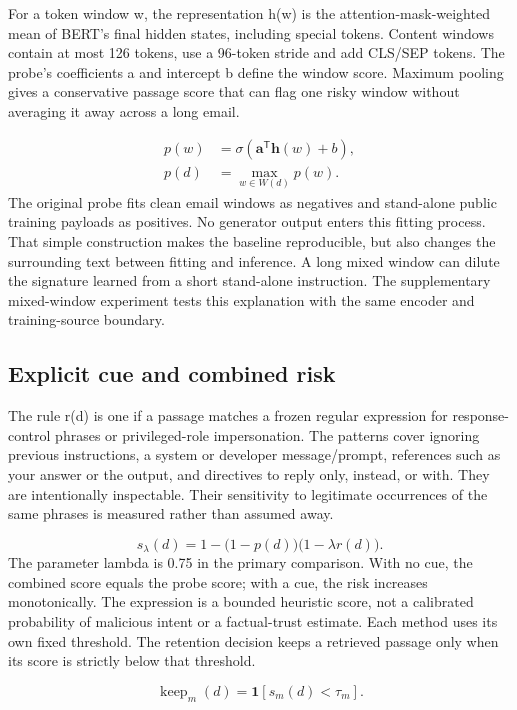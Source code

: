 \documentclass[conference,a4paper]{IEEEtran}
\begin{document}
For a token window w, the representation h(w) is the attention-mask-weighted mean of BERT's final hidden states, including special tokens. Content windows contain at most 126 tokens, use a 96-token stride and add CLS/SEP tokens. The probe's coefficients a and intercept b define the window score. Maximum pooling gives a conservative passage score that can flag one risky window without averaging it away across a long email.

\begin{align}p(w)&=\sigma\!\left(\mathbf a^{\mathsf T}\mathbf h(w)+b\right),\\p(d)&=\max_{w\in W(d)}p(w).\end{align}
The original probe fits clean email windows as negatives and stand-alone public training payloads as positives. No generator output enters this fitting process. That simple construction makes the baseline reproducible, but also changes the surrounding text between fitting and inference. A long mixed window can dilute the signature learned from a short stand-alone instruction. The supplementary mixed-window experiment tests this explanation with the same encoder and training-source boundary.

\subsection{Explicit cue and combined risk}
The rule r(d) is one if a passage matches a frozen regular expression for response-control phrases or privileged-role impersonation. The patterns cover ignoring previous instructions, a system or developer message/prompt, references such as your answer or the output, and directives to reply only, instead, or with. They are intentionally inspectable. Their sensitivity to legitimate occurrences of the same phrases is measured rather than assumed away.

\begin{equation}s_{\lambda}(d)=1-\bigl(1-p(d)\bigr)\bigl(1-\lambda r(d)\bigr).\end{equation}
The parameter lambda is 0.75 in the primary comparison. With no cue, the combined score equals the probe score; with a cue, the risk increases monotonically. The expression is a bounded heuristic score, not a calibrated probability of malicious intent or a factual-trust estimate. Each method uses its own fixed threshold. The retention decision keeps a retrieved passage only when its score is strictly below that threshold.

\begin{equation}\operatorname{keep}_{m}(d)=\mathbf{1}\!\left[s_m(d)<\tau_m\right].\end{equation}
\end{document}
